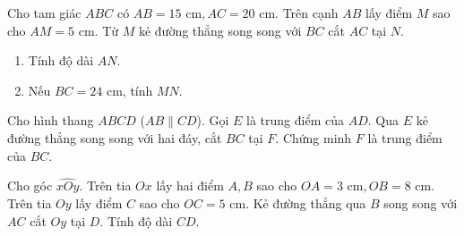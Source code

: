\begin{bt}%
	Cho tam giác $ABC$ có $AB=15\text{ cm}, AC=20\text{ cm}$. Trên cạnh $AB$ lấy điểm $M$ sao cho $AM=5\text{ cm}$. Từ $M$ kẻ đường thẳng song song với $BC$ cắt $AC$ tại $N$.
	\begin{enumerate}
		\item Tính độ dài $AN$.
		\item Nếu $BC=24\text{ cm}$, tính $MN$.
	\end{enumerate}
\end{bt}

\begin{bt}%
	Cho hình thang $ABCD$ ($AB \parallel CD$). Gọi $E$ là trung điểm của $AD$. Qua $E$ kẻ đường thẳng song song với hai đáy, cắt $BC$ tại $F$. Chứng minh $F$ là trung điểm của $BC$.
\end{bt}

\begin{bt}%
	Cho góc $\widehat{xOy}$. Trên tia $Ox$ lấy hai điểm $A, B$ sao cho $OA=3\text{ cm}, OB=8\text{ cm}$. Trên tia $Oy$ lấy điểm $C$ sao cho $OC=5\text{ cm}$. Kẻ đường thẳng qua $B$ song song với $AC$ cắt $Oy$ tại $D$. Tính độ dài $CD$.
\end{bt}

